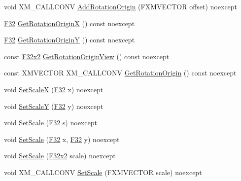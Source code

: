 \begin{DoxyCompactItemize}
\item 
void X\+M\+\_\+\+C\+A\+L\+L\+C\+O\+NV \mbox{\hyperlink{classmage_1_1_sprite_transform2_d_a82590d10e95f9b6ff6f5f34cc9271958}{Add\+Rotation\+Origin}} (F\+X\+M\+V\+E\+C\+T\+OR offset) noexcept
\item 
\mbox{\hyperlink{namespacemage_aa97e833b45f06d60a0a9c4fc22ae02c0}{F32}} \mbox{\hyperlink{classmage_1_1_sprite_transform2_d_a053c009f7f81df2e307fc6b5eb79a3b6}{Get\+Rotation\+OriginX}} () const noexcept
\item 
\mbox{\hyperlink{namespacemage_aa97e833b45f06d60a0a9c4fc22ae02c0}{F32}} \mbox{\hyperlink{classmage_1_1_sprite_transform2_d_a221b1dbbe09bf618ba5e3d396560820a}{Get\+Rotation\+OriginY}} () const noexcept
\item 
const \mbox{\hyperlink{namespacemage_aee4759dedc8def6c6dec26b5c7eddf29}{F32x2}} \mbox{\hyperlink{classmage_1_1_sprite_transform2_d_a0a9ef95aac2534bae9e9408e57165c55}{Get\+Rotation\+Origin\+View}} () const noexcept
\item 
const X\+M\+V\+E\+C\+T\+OR X\+M\+\_\+\+C\+A\+L\+L\+C\+O\+NV \mbox{\hyperlink{classmage_1_1_sprite_transform2_d_a071b4bda311b27033ef24a56073e9f42}{Get\+Rotation\+Origin}} () const noexcept
\item 
void \mbox{\hyperlink{classmage_1_1_sprite_transform2_d_a3a80df8d3e45ff61cad6db60e5c87f7f}{Set\+ScaleX}} (\mbox{\hyperlink{namespacemage_aa97e833b45f06d60a0a9c4fc22ae02c0}{F32}} x) noexcept
\item 
void \mbox{\hyperlink{classmage_1_1_sprite_transform2_d_a48344c5b112fda2219db2e54435c17ac}{Set\+ScaleY}} (\mbox{\hyperlink{namespacemage_aa97e833b45f06d60a0a9c4fc22ae02c0}{F32}} y) noexcept
\item 
void \mbox{\hyperlink{classmage_1_1_sprite_transform2_d_af7835a2436f3a95de5e88a91658b88be}{Set\+Scale}} (\mbox{\hyperlink{namespacemage_aa97e833b45f06d60a0a9c4fc22ae02c0}{F32}} s) noexcept
\item 
void \mbox{\hyperlink{classmage_1_1_sprite_transform2_d_afe066147bc26f517a3cfde1f7fa4112c}{Set\+Scale}} (\mbox{\hyperlink{namespacemage_aa97e833b45f06d60a0a9c4fc22ae02c0}{F32}} x, \mbox{\hyperlink{namespacemage_aa97e833b45f06d60a0a9c4fc22ae02c0}{F32}} y) noexcept
\item 
void \mbox{\hyperlink{classmage_1_1_sprite_transform2_d_aaae98595b810f4e944161ae3a350e67a}{Set\+Scale}} (\mbox{\hyperlink{namespacemage_aee4759dedc8def6c6dec26b5c7eddf29}{F32x2}} scale) noexcept
\item 
void X\+M\+\_\+\+C\+A\+L\+L\+C\+O\+NV \mbox{\hyperlink{classmage_1_1_sprite_transform2_d_a13cb4b836cc12f0528719c08d459e624}{Set\+Scale}} (F\+X\+M\+V\+E\+C\+T\+OR scale) noexcept

\end{DoxyCompactItemize}
